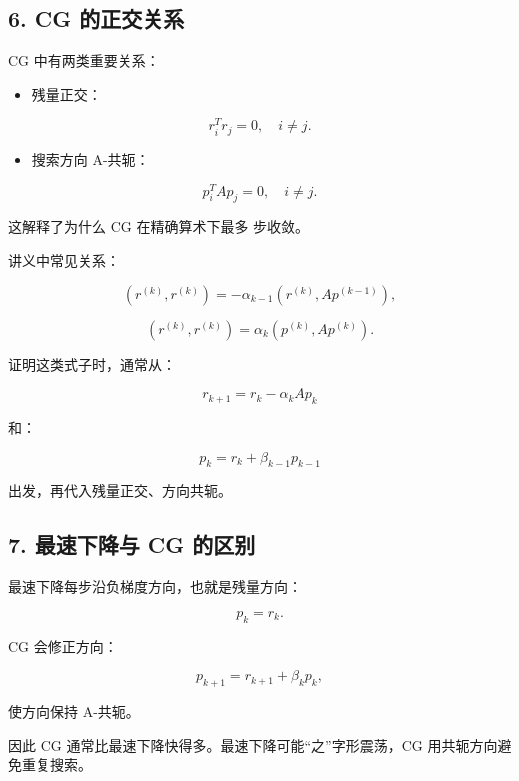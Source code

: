 \documentclass[11pt,a4paper]{ctexart}
\newcommand{\code}[1]{\begingroup\ttfamily\small #1\endgroup}
\begin{document}

\subsection*{6. CG 的正交关系}


CG 中有两类重要关系：

\begin{itemize}

\item 残量正交：

\end{itemize}

\[
r_i^Tr_j=0,\quad i\ne j.
\]

\begin{itemize}

\item 搜索方向 A-共轭：

\end{itemize}

\[
p_i^TAp_j=0,\quad i\ne j.
\]

这解释了为什么 CG 在精确算术下最多 \code{} 步收敛。

讲义中常见关系：

\[
(r^{(k)},r^{(k)})=-\alpha_{k-1}(r^{(k)},Ap^{(k-1)}),
\]

\[
(r^{(k)},r^{(k)})=\alpha_k(p^{(k)},Ap^{(k)}).
\]

证明这类式子时，通常从：

\[
r_{k+1}=r_k-\alpha_kAp_k
\]

和：

\[
p_k=r_k+\beta_{k-1}p_{k-1}
\]

出发，再代入残量正交、方向共轭。


\subsection*{7. 最速下降与 CG 的区别}


最速下降每步沿负梯度方向，也就是残量方向：

\[
p_k=r_k.
\]

CG 会修正方向：

\[
p_{k+1}=r_{k+1}+\beta_kp_k,
\]

使方向保持 A-共轭。

因此 CG 通常比最速下降快得多。最速下降可能“之”字形震荡，CG 用共轭方向避免重复搜索。
\end{document}
